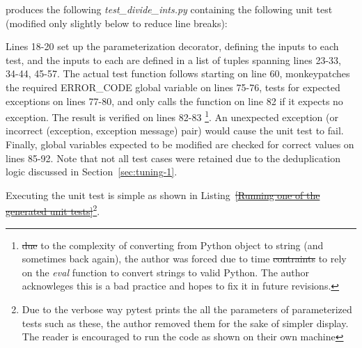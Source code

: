 \documentclass[10pt, conference]{IEEEtran}
\makeatletter
\providecommand{\DIFadd}[1]{{\protect\color{blue}\uwave{#1}}} %
\providecommand{\DIFdel}[1]{{\protect\color{red}\sout{#1}}} %
\providecommand{\DIFaddbegin}{} %
\providecommand{\DIFaddend}{} %
\providecommand{\DIFdelbegin}{} %
\providecommand{\DIFdelend}{} %
\newcommand{\DIFscaledelfig}{0.5}
\newlength{\DIFdelgraphicswidth} %
\newlength{\DIFdelgraphicsheight} %
\newcommand{\DIFaddincludegraphics}[2][]{{\color{blue}\fbox{\DIFOincludegraphics[#1]{#2}}}} %
\newcommand{\DIFdelincludegraphics}[2][]{%
\sbox{\DIFdelgraphicsbox}{\DIFOincludegraphics[#1]{#2}}%
\settoboxwidth{\DIFdelgraphicswidth}{\DIFdelgraphicsbox} %
\settoboxtotalheight{\DIFdelgraphicsheight}{\DIFdelgraphicsbox} %
\scalebox{\DIFscaledelfig}{%
\parbox[b]{\DIFdelgraphicswidth}{\usebox{\DIFdelgraphicsbox}\\[-\baselineskip] \rule{\DIFdelgraphicswidth}{0em}}\llap{\resizebox{\DIFdelgraphicswidth}{\DIFdelgraphicsheight}{%
\setlength{\unitlength}{\DIFdelgraphicswidth}%
\begin{picture}(1,1)%
\thicklines\linethickness{2pt} %
{\color[rgb]{1,0,0}\put(0,0){\framebox(1,1){}}}%
{\color[rgb]{1,0,0}\put(0,0){\line( 1,1){1}}}%
{\color[rgb]{1,0,0}\put(0,1){\line(1,-1){1}}}%
\end{picture}%
}\hspace*{3pt}}} %
} %
\DeclareRobustCommand{\DIFaddbegin}{\DIFOaddbegin \let\includegraphics\DIFaddincludegraphics} %
\DeclareRobustCommand{\DIFaddend}{\DIFOaddend \let\includegraphics\DIFOincludegraphics} %
\DeclareRobustCommand{\DIFdelbegin}{\DIFOdelbegin \let\includegraphics\DIFdelincludegraphics} %
\DeclareRobustCommand{\DIFdelend}{\DIFOaddend \let\includegraphics\DIFOincludegraphics} %
\let\sout@orig\sout %
\renewcommand{\sout}[1]{\ifmmode\text{\sout@orig{\ensuremath{#1}}}\else\sout@orig{#1}\fi} %
\makeatother
\begin{document}
produces the following \textit{test\_divide\_ints.py} containing the following 
unit test (modified only slightly below to reduce line breaks):

\DIFdelbegin %
\DIFdelend \DIFaddbegin 
\DIFaddend 

Lines 18-20 set up the parameterization decorator, defining the inputs to each test,
and the inputs to each are defined in a list of tuples spanning lines 23-33, 
34-44, 45-57.  The actual test function follows starting on line 60, monkeypatches
the required ERROR\_CODE global variable on lines 75-76, tests for expected 
exceptions on lines 77-80, and only calls the function on line 82 if it expects 
no exception. The result is verified on lines 82-83 \footnote{\DIFdelbegin \DIFdel{due }\DIFdelend \DIFaddbegin \DIFadd{Due 
}\DIFaddend to the complexity of converting from Python object to string
(and sometimes back again), the author was forced due to time \DIFdelbegin \DIFdel{contraints }\DIFdelend \DIFaddbegin \DIFadd{constraints }\DIFaddend to
rely on the \textit{eval} function to convert strings to valid Python.  
The author acknowleges this is a bad practice and hopes to fix it in
future revisions.}. An unexpected exception (or incorrect 
(exception, exception message) 
pair) would cause the unit test to fail.  Finally, global variables expected to be modified 
are checked for correct values on lines 85-92.  Note that not all test cases 
were retained due to the deduplication logic discussed in Section~\ref{sec:tuning-1}.

Executing the unit test is simple as shown in Listing~\DIFdelbegin \DIFdel{\ref{Running one of the generated unit tests}}\DIFdelend \DIFaddbegin \DIFadd{\ref{Running}}\DIFaddend \footnote{Due to the verbose way pytest prints the 
all the parameters of  parameterized tests such as these, the author removed
them for the sake of simpler display.  The reader is encouraged to run the code 
as shown on their own machine}.
\end{document}
